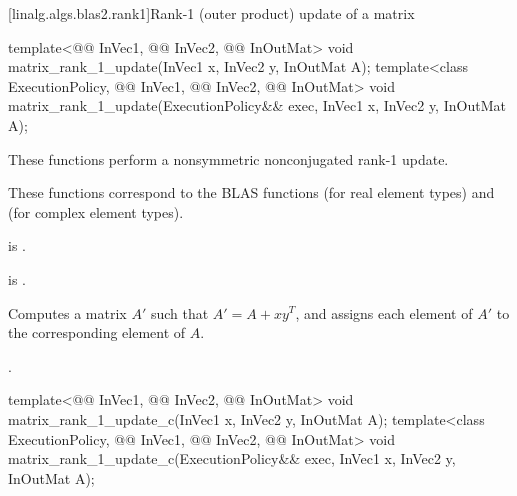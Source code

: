 [linalg.algs.blas2.rank1]{Rank-1 (outer product) update of a matrix}

\begin{itemdecl}
template<@@ InVec1, @@ InVec2, @@ InOutMat>
  void matrix_rank_1_update(InVec1 x, InVec2 y, InOutMat A);
template<class ExecutionPolicy, @@ InVec1, @@ InVec2, @@ InOutMat>
  void matrix_rank_1_update(ExecutionPolicy&& exec, InVec1 x, InVec2 y, InOutMat A);
\end{itemdecl}

\begin{itemdescr}
\pnum
These functions perform a nonsymmetric nonconjugated rank-1 update.
\begin{note}
These functions correspond to the BLAS functions
 (for real element types) and
 (for complex element types)\supercite{blas2}.
\end{note}

\pnum
\mandates
{}
is .

\pnum
\expects
{} is .

\pnum
\effects
Computes a matrix $A'$ such that $A' = A + x y^T$,
and assigns each element of $A'$ to the corresponding element of $A$.

\pnum
\complexity
{}.
\end{itemdescr}

\begin{itemdecl}
template<@@ InVec1, @@ InVec2, @@ InOutMat>
  void matrix_rank_1_update_c(InVec1 x, InVec2 y, InOutMat A);
template<class ExecutionPolicy, @@ InVec1, @@ InVec2, @@ InOutMat>
  void matrix_rank_1_update_c(ExecutionPolicy&& exec, InVec1 x, InVec2 y, InOutMat A);
\end{itemdecl}

